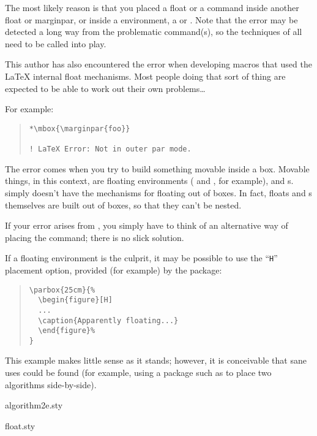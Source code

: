 {The most likely reason is that you placed a float or a 
command inside another float or marginpar, or inside a
 environment, a  or .
Note that the error may be detected a long way from the problematic
command(s), so the techniques of %
 all need to be
called into play.

This author has also encountered the error when developing macros that
used the \LaTeX{} internal float mechanisms.  Most people doing that
sort of thing are expected to be able to work out their own problems\dots{}


For example:
\begin{quote}
\begin{verbatim}
*\mbox{\marginpar{foo}}

! LaTeX Error: Not in outer par mode.
\end{verbatim}
\end{quote}
The error comes when you try to build something movable inside a box.
Movable things, in this context, are floating environments
( and , for example), and
s.  \latex{} simply doesn't have the mechanisms for
floating out of boxes.  In fact, floats and s
themselves are built out of boxes, so that they can't be nested.

If your error arises from , you simply have to think of
an alternative way of placing the command; there is no slick solution.

If a floating environment is the culprit, it may be possible to use
the ``\texttt{H}'' placement option, provided (for example) by the
 package:
\begin{quote}
\begin{verbatim}
\parbox{25cm}{%
  \begin{figure}[H]
  ...
  \caption{Apparently floating...}
  \end{figure}%
}
\end{verbatim}
\end{quote}
This example makes little sense as it stands; however, it is
conceivable that sane uses could be found (for example, using a
package such as  to place two algorithms
side-by-side).
\begin{ctanrefs}
\item[algorithm2e.sty]
\item[float.sty]
\end{ctanrefs}

}
